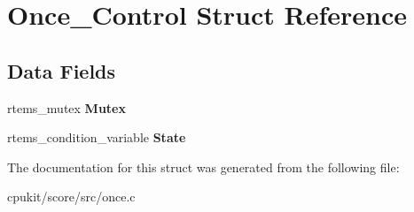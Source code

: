\hypertarget{structOnce__Control}{}\section{Once\+\_\+\+Control Struct Reference}
\label{structOnce__Control}
\subsection*{Data Fields}
\begin{DoxyCompactItemize}
\item 
\mbox{\label{structOnce__Control_a71af0ac687359da6fe3c7b64f7ed9c07}} 
rtems\+\_\+mutex {\bfseries Mutex}
\item 
\mbox{\label{structOnce__Control_ac793360f2c80beafba33f066fb2c93a1}} 
rtems\+\_\+condition\+\_\+variable {\bfseries State}
\end{DoxyCompactItemize}


The documentation for this struct was generated from the following file\+:\begin{DoxyCompactItemize}
\item 
cpukit/score/src/once.\+c\end{DoxyCompactItemize}
